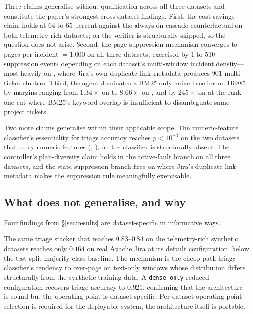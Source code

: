 Three claims generalise without qualification across all three datasets and constitute the paper's strongest cross-dataset findings. First, the cost-savings claim holds at $64$ to $65$ percent against the always-on cascade counterfactual on both telemetry-rich datasets; on \dswol{} the verifier is structurally skipped, so the question does not arise. Second, the page-suppression mechanism converges to pages per incident $= 1.000$ on all three datasets, exercised by $1$ to $510$ suppression events depending on each dataset's multi-window incident density---most heavily on \dswol{}, where Jira's own duplicate-link metadata produces $901$ multi-ticket clusters. Third, the agent dominates a BM25-only naive baseline on Hit@5 by margins ranging from $1.34\times$ on \dsotel{} to $8.66\times$ on \dsob{}, and by $245\times$ on \dswol{} at the rank-one cut where BM25's keyword overlap is insufficient to disambiguate same-project tickets.

Two more claims generalise within their applicable scope. The numeric-feature classifier's essentiality for triage accuracy reaches $p < 10^{-4}$ on the two datasets that carry numeric features (\dsob{}, \dsotel{}); on \dswol{} the classifier is structurally absent. The controller's plan-diversity claim holds in the active-fault branch on all three datasets, and the state-suppression branch fires on \dswol{} where Jira's duplicate-link metadata makes the suppression rule meaningfully exercisable.

\subsection{What does not generalise, and why}
\label{sec:cross-app:doesnt}

Four findings from \S\ref{sec:results} are dataset-specific in informative ways.

 The same triage stacker that reaches $0.83$--$0.84$ on the telemetry-rich synthetic datasets reaches only $0.164$ on real Apache Jira at its default configuration, below the test-split majority-class baseline. The mechanism is the cheap-path triage classifier's tendency to over-page on text-only windows whose distribution differs structurally from the synthetic training data. A \texttt{dense\_only} reduced configuration recovers triage accuracy to $0.921$, confirming that the architecture is sound but the operating point is dataset-specific. Per-dataset operating-point selection is required for the deployable system; the architecture itself is portable.

